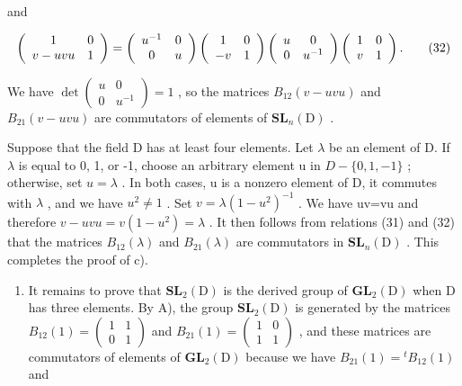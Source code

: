 and

\[
\left( \begin{array}{c c} 1 & 0 \\ v - u v u & 1 \end{array} \right) = \left( \begin{array}{c c} u ^ {- 1} & 0 \\ 0 & u \end{array} \right) \left( \begin{array}{c c} 1 & 0 \\ - v & 1 \end{array} \right) \left( \begin{array}{c c} u & 0 \\ 0 & u ^ {- 1} \end{array} \right) \left( \begin{array}{c c} 1 & 0 \\ v & 1 \end{array} \right).\tag{32}
\]

We have \(\det\left(\begin{matrix}u & 0 \\ 0 & u^{-1}\end{matrix}\right)=1\) , so the matrices \(B_{12}(v-uvu)\) and \(B_{21}(v-uvu)\) are commutators of elements of \(\mathbf{SL}_{n}(\mathrm{D})\) .

Suppose that the field D has at least four elements. Let \(\lambda\) be an element of D. If \(\lambda\) is equal to 0, 1, or -1, choose an arbitrary element u in \(D-\{0,1,-1\}\) ; otherwise, set \(u=\lambda\) . In both cases, u is a nonzero element of D, it commutes with \(\lambda\) , and we have \(u^{2}\neq1\) . Set \(v=\lambda(1-u^{2})^{-1}\) . We have uv=vu and therefore \(v-uvu=v(1-u^{2})=\lambda\) . It then follows from relations (31) and (32) that the matrices \(B_{12}(\lambda)\) and \(B_{21}(\lambda)\) are commutators in \(\mathbf{SL}_{n}(\mathrm{D})\) . This completes the proof of c).

\begin{enumerate}
\def\labelenumi{\Alph{enumi})}
\setcounter{enumi}{2}
\tightlist
\item
  It remains to prove that \(\mathbf{SL}_{2}(\mathrm{D})\) is the derived group of \(\mathbf{GL}_{2}(\mathrm{D})\) when D has three elements. By A), the group \(\mathbf{SL}_{2}(\mathrm{D})\) is generated by the matrices \(B_{12}(1)=(\begin{matrix}{1}&{1}\\ {0}&{1}\end{matrix})\) and \(B_{21}(1)=(\begin{matrix}{1}&{0}\\ {1}&{1}\end{matrix})\) , and these matrices are commutators of elements of \(\mathbf{GL}_{2}(\mathrm{D})\) because we have \(B_{21}(1)={}^{t}B_{12}(1)\) and
\end{enumerate}


